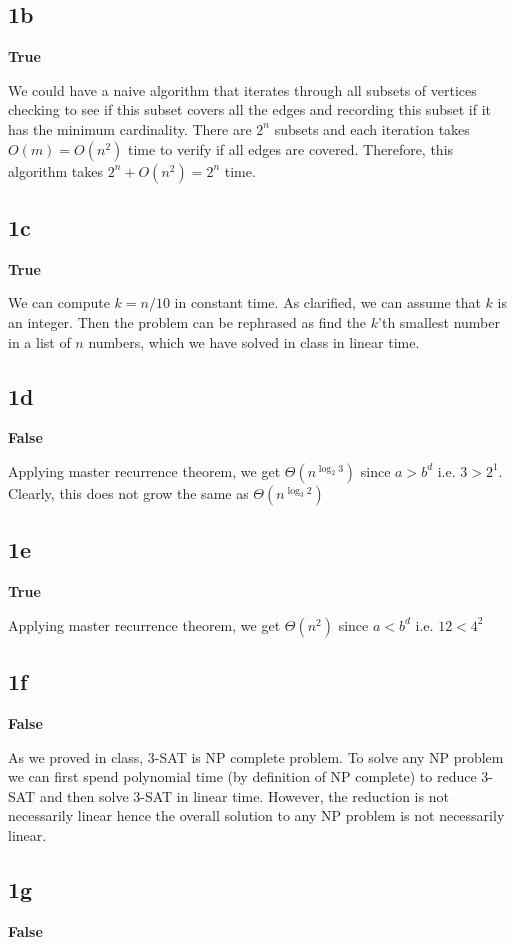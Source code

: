 \documentclass{article}
\begin{document}
    \subsection*{1b}
    \textbf{True}

    We could have a naive algorithm that iterates through all subsets of vertices checking to see if this subset covers all the edges and recording this subset if it has the minimum cardinality. There are $2^n$ subsets and each iteration takes $O(m) = O(n^2)$ time to verify if all edges are covered. Therefore, this algorithm takes $2^n + O(n^2) = 2^n$ time.

    \subsection*{1c}
    \textbf{True}

    We can compute $k = n/10$ in constant time. As clarified, we can assume that $k$ is an integer. Then the problem can be rephrased as find the $k$'th smallest number in a list of $n$ numbers, which we have solved in class in linear time.

    \subsection*{1d}
    \textbf{False}

    Applying master recurrence theorem, we get $\Theta(n^{\log_2 3})$ since $a > b^d$ i.e. $3 > 2^1$. Clearly, this does not grow the same as $\Theta(n^{\log_3 2})$

    \subsection*{1e}
    \textbf{True}

    Applying master recurrence theorem, we get $\Theta(n^2)$ since $a < b^d$ i.e. $12 < 4^2$

    \subsection*{1f}
    \textbf{False}

    As we proved in class, 3-SAT is NP complete problem. To solve any NP problem we can first spend polynomial time (by definition of NP complete) to reduce 3-SAT and then solve 3-SAT in linear time. However, the reduction is not necessarily linear hence the overall solution to any NP problem is not necessarily linear.

    \subsection*{1g}
    \textbf{False}
\end{document}
